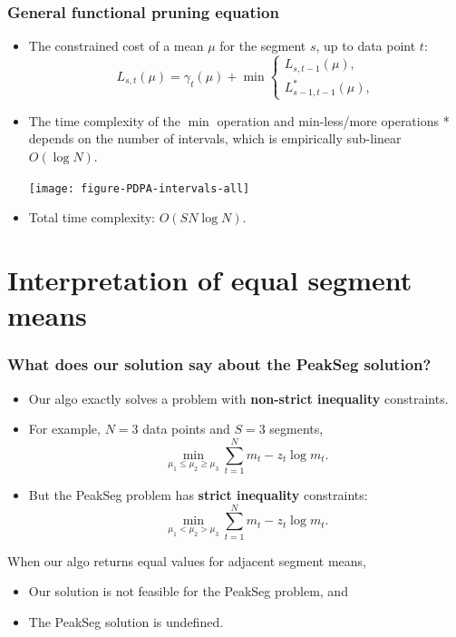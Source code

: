 \documentclass{beamer}
\begin{document}
\begin{frame}
  \frametitle{General functional pruning equation}
  \begin{itemize}
  \item The constrained cost of a mean $\mu$ for the segment $s$,
    up to data point $t$:
    \begin{equation*}
      L_{s,t}(\mu) = \gamma_t(\mu) + \min
      \begin{cases}
        L_{s,t-1}(\mu),\\
        L_{s-1,t-1}^{*}(\mu),
      \end{cases}
    \end{equation*}
  \item The time complexity of the $\min$ operation and min-less/more
    operations * depends on the number of intervals, which is
    empirically sub-linear $O(\log N)$.
    \begin{center}
      \texttt{[image: figure-PDPA-intervals-all]}
    \end{center}
  \item Total time complexity: $O(S N\log N)$.
  \end{itemize}
\end{frame}

\section{Interpretation of equal segment means}

\begin{frame}
  \frametitle{What does our solution say about the PeakSeg solution?}
  \begin{itemize}
  \item Our algo exactly solves a problem with \textbf{non-strict
      inequality} constraints.
  \item For example, $N=3$ data points and $S=3$ segments,
    \begin{equation*}
      \min_{\mu_1\leq\mu_2\geq\mu_3}
      \sum_{t=1}^N m_t - z_t\log m_t.
    \end{equation*}
  \item But the PeakSeg problem has \textbf{strict inequality}
    constraints:
    \begin{equation*}
      \min_{\mu_1<\mu_2 >\mu_3}
      \sum_{t=1}^N m_t - z_t\log m_t.
    \end{equation*}
  \end{itemize}
  When our algo returns equal values for adjacent segment means,
  \begin{itemize}
  \item Our solution is not feasible for the PeakSeg problem, and
  \item The PeakSeg solution is undefined.
  \end{itemize}
\end{frame}
\end{document}

